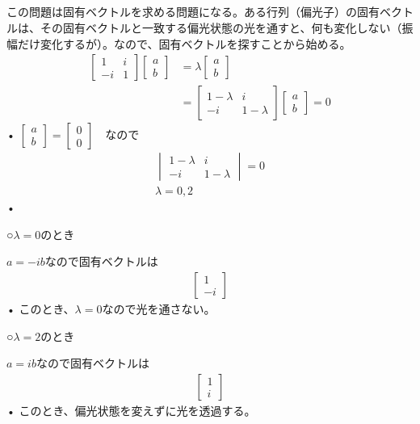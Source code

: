 \documentclass{jsarticle}
\begin{document}
\subsection{}
この問題は固有ベクトルを求める問題になる。ある行列（偏光子）の固有ベクトルは、その固有ベクトルと一致する偏光状態の光を通すと、何も変化しない（振幅だけ変化するが）。なので、固有ベクトルを探すことから始める。
\begin{align}
\begin{bmatrix}
1 & i \\
-i & 1
\end{bmatrix}
\begin{bmatrix}
a  \\
b 
\end{bmatrix}
&=
\lambda
\begin{bmatrix}
a  \\
b 
\end{bmatrix} \\
&=
\begin{bmatrix}
1-\lambda & i \\
-i & 1-\lambda
\end{bmatrix}
\begin{bmatrix}
a  \\
b 
\end{bmatrix} =0
\end{align}•
$\begin{bmatrix}
a  \\
b 
\end{bmatrix}=\begin{bmatrix}
0  \\
0 
\end{bmatrix}$　なので
\begin{align}
\begin{vmatrix}
1-\lambda & i \\
-i & 1-\lambda
\end{vmatrix}
=0 \\
\lambda=0,2
\end{align}•

○$\lambda=0$のとき


$a=-ib$なので固有ベクトルは
\begin{align}
\begin{bmatrix}
1  \\
-i 
\end{bmatrix}
\end{align}•
このとき、$\lambda = 0$なので光を通さない。

○$\lambda=2$のとき


$a=ib$なので固有ベクトルは
\begin{align}
\begin{bmatrix}
1  \\
i 
\end{bmatrix}
\end{align}•
このとき、偏光状態を変えずに光を透過する。
\end{document}
